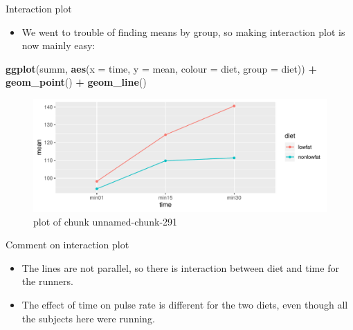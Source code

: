 \documentclass[ignorenonframetext,]{beamer}
\newenvironment{Shaded}{\begin{snugshade}}{\end{snugshade}}
\newcommand{\DataTypeTok}[1]{\textcolor[rgb]{0.13,0.29,0.53}{#1}}
\newcommand{\KeywordTok}[1]{\textcolor[rgb]{0.13,0.29,0.53}{\textbf{#1}}}
\newcommand{\NormalTok}[1]{#1}
\newcommand{\OperatorTok}[1]{\textcolor[rgb]{0.81,0.36,0.00}{\textbf{#1}}}
\newcommand{\StringTok}[1]{\textcolor[rgb]{0.31,0.60,0.02}{#1}}
\providecommand{\tightlist}{%
  \setlength{\itemsep}{0pt}\setlength{\parskip}{0pt}}
\begin{document}
\begin{frame}[fragile]{Interaction plot}
\protect\hypertarget{interaction-plot-4}{}

\begin{itemize}
\tightlist
\item
  We went to trouble of finding means by group, so making interaction
  plot is now mainly easy:
\end{itemize}

\begin{Shaded}
\begin{Highlighting}[]
\KeywordTok{ggplot}\NormalTok{(summ, }\KeywordTok{aes}\NormalTok{(}\DataTypeTok{x =}\NormalTok{ time, }\DataTypeTok{y =}\NormalTok{ mean, }\DataTypeTok{colour =}\NormalTok{ diet,}
                 \DataTypeTok{group =}\NormalTok{ diet)) }\OperatorTok{+}\StringTok{ }\KeywordTok{geom_point}\NormalTok{() }\OperatorTok{+}\StringTok{ }\KeywordTok{geom_line}\NormalTok{()}
\end{Highlighting}
\end{Shaded}

\begin{figure}
\centering
\includegraphics{figure/unnamed-chunk-291-1.pdf}
\caption{plot of chunk unnamed-chunk-291}
\end{figure}

\end{frame}

\begin{frame}{Comment on interaction plot}
\protect\hypertarget{comment-on-interaction-plot}{}

\begin{itemize}
\tightlist
\item
  The lines are not parallel, so there is interaction between diet and
  time for the runners.
\item
  The effect of time on pulse rate is different for the two diets, even
  though all the subjects here were running.
\end{itemize}

\end{frame}
\end{document}

